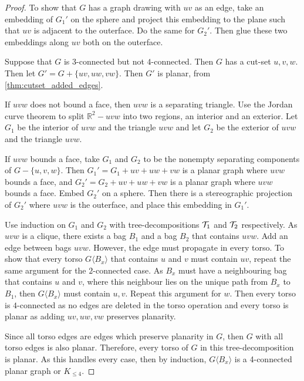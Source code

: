 \begin{proof}
	To show that $G$ has a graph drawing with $uv$ as an edge, take an embedding of $G_1'$ on the sphere and project this embedding to the plane such that $uv$ is adjacent to the outerface. Do the same for $G_2'$. Then glue these two embeddings along $uv$ both on the outerface. 

	Suppose that $G$ is $3$-connected but not $4$-connected. Then $G$ has a cut-set $u,v,w$. Then let $G' = G + \{uv, uw, vw\}$. Then $G'$ is planar, from \cref{thm:cutset_added_edges}. 
	
	If $uvw$ does not bound a face, then $uvw$ is a separating triangle. Use the Jordan curve theorem to split $\mathbb{R}^2 - uvw$ into two regions, an interior and an exterior. Let $G_1$ be the interior of $uvw$ and the triangle $uvw$ and let $G_2$ be the exterior of $uvw$ and the triangle $uvw$. 

	If $uvw$ bounds a face, take $G_1$ and $G_2$ to be the nonempty separating components of $G - \{u,v,w\}$. Then $G_1' = G_1 + uv + uw + vw$ is a planar graph where $uvw$ bounds a face, and $G_2' = G_2 + uv + uw + vw$ is a planar graph where $uvw$ bounds a face. Embed $G_2'$ on a sphere. Then there is a stereographic projection of $G_2'$ where $uvw$ is the outerface, and place this embedding in $G_1'$. 

	Use induction on $G_1$ and $G_2$ with tree-decompositions $\mathcal{T}_1$ and $\mathcal{T}_2$ respectively. As $uvw$ is a clique, there exists a bag $B_1$ and a bag $B_2$ that contains $uvw$. Add an edge between bags $uvw$. However, the edge must propagate in every torso. To show that every torso $G\langle B_x \rangle$ that contains $u$ and $v$ must contain $uv$, repeat the same argument for the $2$-connected case. As $B_x$ must have a neighbouring bag that contains $u$ and $v$, where this neighbour lies on the unique path from $B_x$ to $B_1$, then $G\langle B_x \rangle$ must contain $u, v$. Repeat this argument for $w$. Then every torso is $4$-connected as no edges are deleted in the torso operation and every torso is planar as adding $uv, uw, vw$ preserves planarity. 

	Since all torso edges are edges which preserve planarity in $G$, then $G$ with all torso edges is also planar. Therefore, every torso of $G$ in this tree-decomposition is planar.
	As this handles every case, then by induction, $G \langle B_x \rangle$ is a 4-connected planar graph or $K_{\leq 4}$. 
\end{proof}